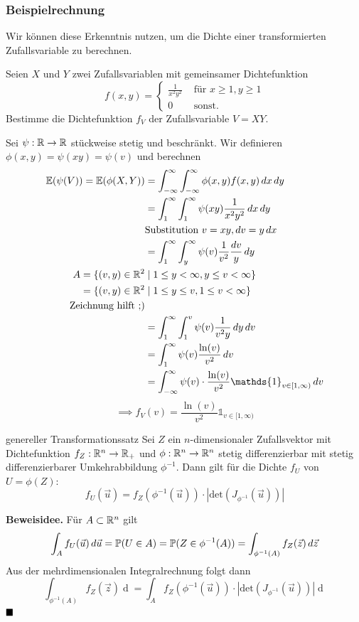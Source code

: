 \subsubsection*{Beispielrechnung}

Wir können diese Erkenntnis nutzen, um die Dichte einer transformierten Zufallsvariable zu berechnen.

Seien $X$ und $Y$ zwei Zufallsvariablen mit gemeinsamer Dichtefunktion
$$f(x,y) = \begin{cases}
    \frac{1}{x^2y^2} & \text{ für } x \geq 1, y \geq 1\\
    0 & \text{ sonst.}
\end{cases}$$
Bestimme die Dichtefunktion $f_V$ der Zufallsvariable $V = XY$.

Sei $\psi: \R \to \R$ stückweise stetig und beschränkt.
Wir definieren $\phi(x, y) = \psi(xy) = \psi(v)$ und berechnen 
\begin{align*}
    \E(\psi(V)) = \E(\phi(X,Y)) &= \int_{-\infty}^{\infty}\int_{-\infty}^{\infty}\phi(x,y)f(x,y)\dx\mathop{dy}\\
    &= \int_{1}^{\infty}\int_{1}^{\infty}\psi(xy)\frac{1}{x^2y^2}\dx\mathop{dy}\\
    &\text{Substitution } v = xy, \mathop{dv} = y\mathop{dx}\\
    &= \int_{1}^{\infty}\int_{y}^{\infty}\psi(v)\frac{1}{v^2}\frac{\mathop{dv}}{y}\mathop{dy}\\
    A = \{(v, y) \in \R^2 &\mid 1 \leq y < \infty, y \leq v < \infty\}\\
    = \{(v, y) \in \R^2 &\mid 1 \leq y \leq v, 1 \leq v < \infty\}\\
    \text{Zeichnung hilft ;)}\\
    &= \int_{1}^{\infty}\int_{1}^{v}\psi(v)\frac{1}{v^2y}\mathop{dy}\mathop{dv}\\
    &= \int_{1}^{\infty}\psi(v)\frac{\ln(v)}{v^2}\mathop{dv}\\
    &= \int_{-\infty}^{\infty}\psi(v) \cdot \frac{\ln(v)}{v^2}\mathds{1}_{v \in [1,\infty)}\mathop{dv}
\end{align*}
$$\implies f_V(v) = \frac{\ln(v)}{v^2}\mathds{1}_{v \in [1,\infty)}$$

\begin{mainbox}{genereller Transformationssatz}
    Sei $Z$ ein $n$-dimensionaler Zufallsvektor mit Dichtefunktion $f_Z: \R^n \to \R_+$ und $\phi: \R^n \to \R^n$ stetig differenzierbar mit stetig differenzierbarer Umkehrabbildung $\phi^{-1}$. Dann gilt für die Dichte $f_U$ von $U = \phi(Z)$:
    \[f_U(\vec{u}) = f_Z\left(\phi^{-1}\left(\vec{u}\right)\right) \cdot |\text{det}(J_{\phi^{-1}}(\vec{u}))|\]
\end{mainbox}
\textbf{Beweisidee.} Für $A \subset \R^n$ gilt
\[\int_{A}f_U(\vec{u})\mathop{d\vec{u}} = \P(U \in A) = \P(Z \in \phi^{-1}(A)) = \int_{\phi^{-1}(A)}f_Z(\vec{z})\mathop{d\vec{z}}\]
Aus der mehrdimensionalen Integralrechnung folgt dann
\[\int_{\phi^{-1}(A)}f_Z(\vec{z})\mathop{d\vec{z}} = \int_{A}f_Z\left(\phi^{-1}\left(\vec{u}\right)\right) \cdot |\text{det}(J_{\phi^{-1}}(\vec{u}))|\mathop{d\vec{u}}\]
$\hfill\blacksquare$
